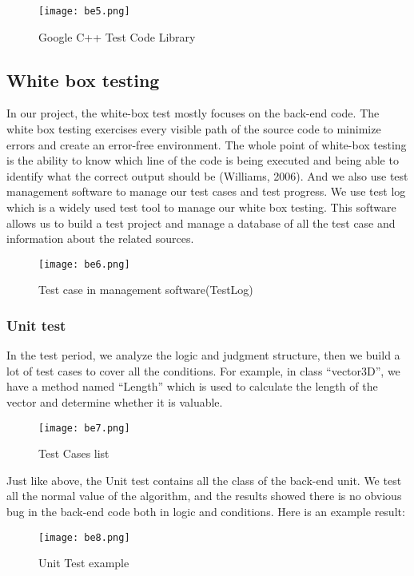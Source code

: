 \documentclass[11pt]{article}
\begin{document}
\begin{figure}[H]

\centering
\texttt{[image: be5.png]}
\caption{Google C++ Test Code Library}
\label{fig:label}
\end{figure}

\subsection{White box testing}
In our project, the white-box test mostly focuses on the back-end code. The white box testing exercises every visible path of the source code to minimize errors and create an error-free environment. The whole point of white-box testing is the ability to know which line of the code is being executed and being able to identify what the correct output should be (Williams, 2006).
And we also use test management software to manage our test cases and test progress. We use test log which is a widely used test tool to manage our white box testing. This software allows us to build a test project and manage a database of all the test case and information about the related sources.

\begin{figure}[H]

\centering
\texttt{[image: be6.png]}
\caption{Test case in management software(TestLog)}
\label{fig:label}
\end{figure}

\subsubsection{Unit test}
In the test period, we analyze the logic and judgment structure, then we build a lot of test cases to cover all the conditions. For example, in class “vector3D”, we have a method named “Length” which is used to calculate the length of the vector and determine whether it is valuable.

\begin{figure}[H]
\centering
\texttt{[image: be7.png]}
\caption{Test Cases list}
\label{fig:label}
\end{figure}

Just like above, the Unit test contains all the class of the back-end unit. We test all the normal value of the algorithm, and the results showed there is no obvious bug in the back-end code both in logic and conditions. Here is an example result:

\begin{figure}[H]
\centering
\texttt{[image: be8.png]}
\caption{Unit Test example}
\label{fig:label}
\end{figure}
\end{document}
